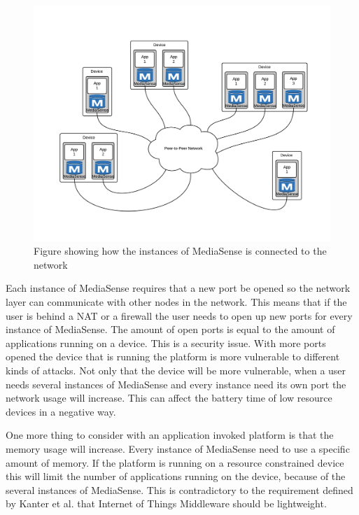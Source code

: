\begin{figure}[t]
	\centering
    	\includegraphics[scale=0.25]{part_2/mediasense/several_nodes_on_one_device.png}
		\caption{Figure showing how the instances of MediaSense is connected to the network} 
\end{figure}

Each instance of MediaSense requires that a new port be opened so the network layer can communicate with other nodes in the network. This means that if the user is behind a NAT or a firewall the user needs to open up new ports for every instance of MediaSense. The amount of open ports is equal to the amount of applications running on a device. This is a security issue. With more ports opened the device that is running the platform is more vulnerable to different kinds of attacks. Not only that the device will be more vulnerable, when a user needs several instances of MediaSense and every instance need its own port the network usage will increase. This can affect the battery time of low resource devices in a negative way.

One more thing to consider with an application invoked platform is that the memory usage will increase. Every instance of MediaSense need to use a specific amount of memory. If the platform is running on a resource constrained device this will limit the number of applications running on the device, because of the several instances of MediaSense. This is contradictory to the requirement defined by Kanter et al. \cite{Kanter539187} that Internet of Things Middleware should be lightweight.


